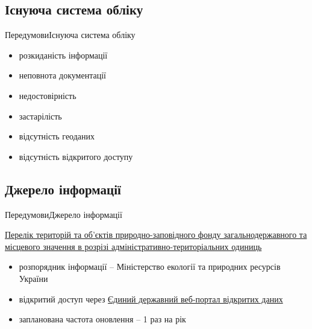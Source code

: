 \documentclass[12pt, aspectratio=1610]{beamer}
\begin{document}
\subsection{Існуюча система обліку}
\begin{frame}{Передумови}{Існуюча система обліку}
		\begin{itemize}
			\item розкиданість інформації
			\item неповнота документації
			\item недостовірність
			\item застарілість
			\item відсутність геоданих
			\item відсутність відкритого доступу
		\end{itemize}
\end{frame}

\subsection{Джерело інформації}
\begin{frame}{Передумови}{Джерело інформації}
 \begin{block}{\href{http://data.gov.ua/passport/9e011264-c16d-42ab-95f1-b06f7311103e}{Перелік територій та об'єктів природно-заповідного фонду загальнодержавного та місцевого значення в розрізі адміністративно-територіальних одиниць}}
	\begin{itemize}
		\item розпорядник інформації -- Міністерство екології та природних ресурсів України
		\item відкритий доступ через \href{http://data.gov.ua/passport/9e011264-c16d-42ab-95f1-b06f7311103e}{Єдиний державний веб-портал відкритих даних}
		\item запланована частота оновлення -- 1 раз на рік
	\end{itemize}
 \end{block}
\end{frame}
\end{document}
